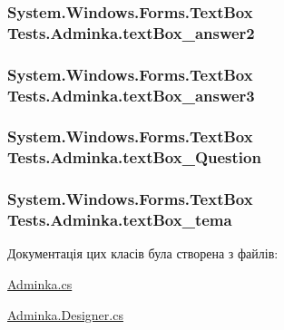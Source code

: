 \subsubsection[{\texorpdfstring{text\+Box\+\_\+answer2}{textBox_answer2}}]{\setlength{\rightskip}{0pt plus 5cm}System.\+Windows.\+Forms.\+Text\+Box Tests.\+Adminka.\+text\+Box\+\_\+answer2\hspace{0.3cm}{\ttfamily [private]}}\hypertarget{class_tests_1_1_adminka_afff68b1022251085154e49d62a23384c}{}\label{class_tests_1_1_adminka_afff68b1022251085154e49d62a23384c}
\subsubsection[{\texorpdfstring{text\+Box\+\_\+answer3}{textBox_answer3}}]{\setlength{\rightskip}{0pt plus 5cm}System.\+Windows.\+Forms.\+Text\+Box Tests.\+Adminka.\+text\+Box\+\_\+answer3\hspace{0.3cm}{\ttfamily [private]}}\hypertarget{class_tests_1_1_adminka_ae3b9da7c9adc45d124cd949d7e36fa49}{}\label{class_tests_1_1_adminka_ae3b9da7c9adc45d124cd949d7e36fa49}
\subsubsection[{\texorpdfstring{text\+Box\+\_\+\+Question}{textBox_Question}}]{\setlength{\rightskip}{0pt plus 5cm}System.\+Windows.\+Forms.\+Text\+Box Tests.\+Adminka.\+text\+Box\+\_\+\+Question\hspace{0.3cm}{\ttfamily [private]}}\hypertarget{class_tests_1_1_adminka_ae9d52a9b2893c5ea478b87306fb97bb5}{}\label{class_tests_1_1_adminka_ae9d52a9b2893c5ea478b87306fb97bb5}
\subsubsection[{\texorpdfstring{text\+Box\+\_\+tema}{textBox_tema}}]{\setlength{\rightskip}{0pt plus 5cm}System.\+Windows.\+Forms.\+Text\+Box Tests.\+Adminka.\+text\+Box\+\_\+tema\hspace{0.3cm}{\ttfamily [private]}}\hypertarget{class_tests_1_1_adminka_a8636ea15196a859ed3d64c6f32ea5afc}{}\label{class_tests_1_1_adminka_a8636ea15196a859ed3d64c6f32ea5afc}


Документація цих класів була створена з файлів\+:\begin{DoxyCompactItemize}
\item 
\hyperlink{_adminka_8cs}{Adminka.\+cs}\item 
\hyperlink{_adminka_8_designer_8cs}{Adminka.\+Designer.\+cs}\end{DoxyCompactItemize}
